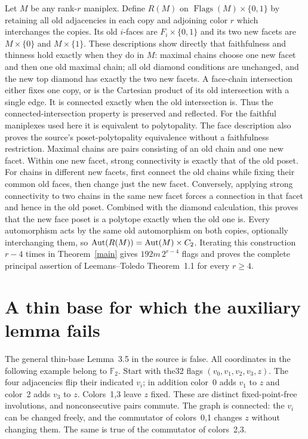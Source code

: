 \documentclass[a4paper,11pt]{article}
\begin{document}
Let $M$ be any rank-$r$ maniplex. Define $R(M)$ on
$\operatorname{Flags}(M)\times\{0,1\}$ by retaining all old adjacencies
in each copy and adjoining color $r$ which interchanges the copies.
Its old $i$-faces are $F_i\times\{0,1\}$ and its two new facets are
$M\times\{0\}$ and $M\times\{1\}$. These descriptions show directly
that faithfulness and thinness hold exactly when they do in $M$:
maximal chains choose one new facet and then one old maximal chain;
all old diamond conditions are unchanged, and the new top diamond has
exactly the two new facets. A face-chain intersection either fixes one
copy, or is the Cartesian product of its old intersection with a single
edge. It is connected exactly when the old intersection is. Thus the connected-intersection property is preserved and reflected.
For the faithful maniplexes used here it is equivalent to polytopality.
The face description also proves the source's poset-polytopality equivalence
without a faithfulness restriction. Maximal chains are pairs consisting of
an old chain and one new facet. Within one new facet, strong connectivity
is exactly that of the old poset. For chains in different new facets,
first connect the old chains while fixing their common old faces, then
change just the new facet. Conversely, applying strong connectivity to
two chains in the same new facet forces a connection in that facet and
hence in the old poset. Combined with the diamond calculation, this proves
that the new face poset is a polytope exactly when the old one is. Every automorphism acts by the same old automorphism
on both copies, optionally interchanging them, so
$\operatorname{Aut}(R(M))=\operatorname{Aut}(M)\times C_2$.
Iterating this construction $r-4$ times in Theorem~\ref{main} gives
$192m\,2^{r-4}$ flags and proves the complete principal assertion of
Leemans--Toledo Theorem~1.1 for every $r\geq4$.

\section{A thin base for which the auxiliary lemma fails}
The general thin-base Lemma~3.5 in the source is false. All coordinates
in the following example belong to $\mathbb F_2$. Start with the32 flags
$(v_0,v_1,v_2,v_3,z)$. The four adjacencies flip their indicated $v_i$;
in addition color~0 adds $v_1$ to $z$ and color~2 adds $v_3$ to $z$.
Colors~1,3 leave $z$ fixed. These are distinct fixed-point-free involutions,
and nonconsecutive pairs commute. The graph is connected: the $v_i$
can be changed freely, and the commutator of colors~0,1 changes $z$
without changing them. The same is true of the commutator of colors~2,3.
\end{document}
